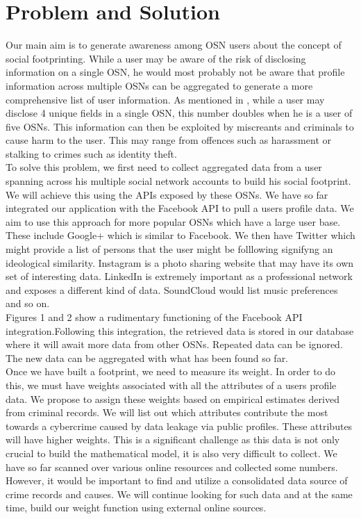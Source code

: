 \documentclass[conference]{IEEEtran}
\begin{document}
\section{Problem and Solution}
Our main aim is to generate awareness among OSN users about the concept of social footprinting. While a user may be aware of the risk of disclosing information on a single OSN, he would most probably not be aware that profile information across multiple OSNs can be aggregated to generate a more comprehensive list of user information. As mentioned in \cite{emergingthreat}, while a user may disclose 4 unique fields in a single OSN, this number doubles when he is a user of five OSNs. This information can then be exploited by miscreants and criminals to cause harm to the user. This may range from offences such as harassment or stalking to crimes such as identity theft. \\

To solve this problem, we first need to collect aggregated data from a user spanning across his multiple social network accounts to build his social footprint. We will achieve this using the APIs exposed by these OSNs. We have so far integrated our application with the Facebook API to pull a users profile data. We aim to use this approach for more popular OSNs which have a large user base. These include Google+ which is similar to Facebook. We then have Twitter which might provide a list of persons that the user might be folllowing signifyng an ideological similarity. Instagram is a photo sharing website that may have its own set of interesting data. LinkedIn is extremely important as a professional network and exposes a different kind of data. SoundCloud would list music preferences and so on.\\

Figures 1 and 2 show a rudimentary functioning of the Facebook API integration.Following this integration, the retrieved data is stored in our database where it will await more data from other OSNs. Repeated data can be ignored. The new data can be aggregated with what has been found so far.\\

Once we have built a footprint, we need to measure its weight. In order to do this, we must have weights associated with all the attributes of a users profile data. We propose to assign these weights based on empirical estimates derived from criminal records. We will list out which attributes contribute the most towards a cybercrime caused by data leakage via public profiles. These attributes will have higher weights. This is a significant challenge as this data is not only crucial to build the mathematical model, it is also very difficult to collect. We have so far scanned over various online resources and collected some numbers. However, it would be important to find and utilize a consolidated data source of crime records and causes. We will continue looking for such data and at the same time, build our weight function using external online sources.\\
\end{document}
